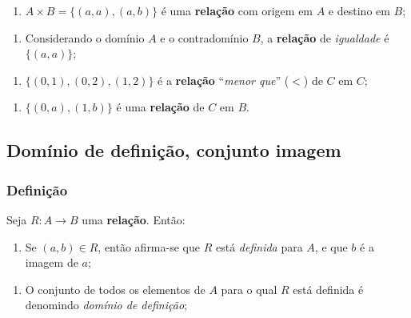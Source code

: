     \begin{enumerate}
\def\labelenumi{\arabic{enumi})}
\setcounter{enumi}{1}
\item
  \(A\times B=\{(a,a), (a,b)\}\) é uma \textbf{relação} com origem em
  \(A\) e destino em \(B\);
\end{enumerate}

    \begin{enumerate}
\def\labelenumi{\arabic{enumi})}
\setcounter{enumi}{2}
\item
  Considerando o domínio \(A\) e o contradomínio \(B\), a
  \textbf{relação} de \emph{igualdade} é \(\{(a,a)\}\);
\end{enumerate}

    \begin{enumerate}
\def\labelenumi{\arabic{enumi})}
\setcounter{enumi}{3}
\item
  \(\{(0,1),(0,2),(1,2)\}\) é a \textbf{relação} ``\emph{menor que}''
  (\(<\)) de \(C\) em \(C\);
\end{enumerate}

    \begin{enumerate}
\def\labelenumi{\arabic{enumi})}
\setcounter{enumi}{4}
\item
  \(\{(0,a),(1,b)\}\) é uma \textbf{relação} de \(C\) em \(B\).
\end{enumerate}

\subsection{Domínio de definição, conjunto
imagem}

\subsubsection{Definição}

Seja \(R: A\rightarrow B\) uma \textbf{relação}. Então:

\begin{enumerate}
\def\labelenumi{\arabic{enumi})}
\item
  Se \((a,b)\in R\), então afirma-se que \(R\) está \emph{definida} para
  \(A\), e que \(b\) é a imagem de \(a\);
\end{enumerate}

    \begin{enumerate}
\def\labelenumi{\arabic{enumi})}
\setcounter{enumi}{1}
\item
  O conjunto de todos os elementos de \(A\) para o qual \(R\) está
  definida é denomindo \emph{domínio de definição};
\end{enumerate}


